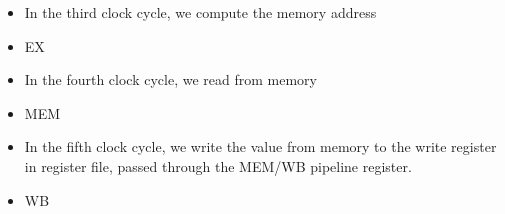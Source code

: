 \begin{frame}[fragile]
        \begin{itemize}
          \item In the third clock cycle, we compute the memory address
        \end{itemize}
\BNotes\ifnum{}
\begin{itemize}
  \item EX
\end{itemize}
\fi\ENotes
\end{frame}

\begin{frame}[fragile]
        \begin{itemize}
          \item In the fourth clock cycle, we read from memory
        \end{itemize}
\BNotes\ifnum{}
\begin{itemize}
  \item MEM
\end{itemize}
\fi\ENotes
\end{frame}

\begin{frame}[fragile]
        \begin{itemize}
        \item In the fifth clock cycle, we write the value from memory
          to the write register in register file, passed through the MEM/WB pipeline register.
        \end{itemize}
\BNotes\ifnum{}
\begin{itemize}
  \item WB
\end{itemize}
\fi\ENotes
\end{frame}


